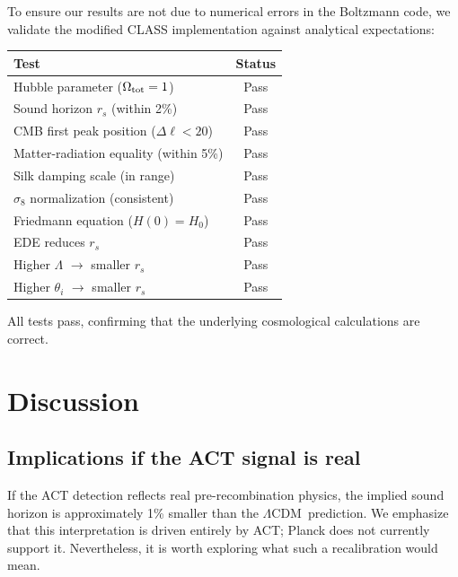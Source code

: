 \documentclass[twocolumn,showpacs,preprintnumbers,amsmath,amssymb,prd]{revtex4-2}
\newcommand{\lcdm}{$\Lambda$CDM}
\begin{document}
To ensure our results are not due to numerical errors in the Boltzmann 
code, we validate the modified \textsc{CLASS} implementation against 
analytical expectations:
\begin{center}
\begin{tabular}{lc}
\toprule
Test & Status \\
\midrule
Hubble parameter ($\Omega_{\rm tot} = 1$) & Pass \\
Sound horizon $r_s$ (within 2\%) & Pass \\
CMB first peak position ($\Delta\ell < 20$) & Pass \\
Matter-radiation equality (within 5\%) & Pass \\
Silk damping scale (in range) & Pass \\
$\sigma_8$ normalization (consistent) & Pass \\
Friedmann equation ($H(0) = H_0$) & Pass \\
EDE reduces $r_s$ & Pass \\
Higher $\Lambda$ $\to$ smaller $r_s$ & Pass \\
Higher $\theta_i$ $\to$ smaller $r_s$ & Pass \\
\bottomrule
\end{tabular}
\end{center}

All tests pass, confirming that the underlying cosmological calculations 
are correct.

\section{Discussion}
\label{sec:discussion}

\subsection{Implications if the ACT signal is real}

If the ACT detection reflects real pre-recombination physics, the 
implied sound horizon is approximately 1\% smaller than the \lcdm\ 
prediction. We emphasize that this interpretation is driven entirely 
by ACT; Planck does not currently support it. Nevertheless, it is 
worth exploring what such a recalibration would mean.
\end{document}
